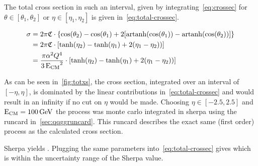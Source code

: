 The total cross section in such an interval, given by
integrating~\eqref{eq:crossec} for \(\theta\in [\theta_1, \theta_2]\)
or \(\eta\in [\eta_1, \eta_2]\) is given
in~\eqref{eq:total-crossec}.

\begin{equation}
  \label{eq:total-crossec}
  \begin{split}
  \sigma &=
  2\pi\mathfrak{C}\cdot\qty{\cos(\theta_2)-\cos(\theta_1)+2\qty[\operatorname{artanh}(\cos(\theta_1))
    - \operatorname{artanh}(\cos(\theta_2))]} \\
  &=2\pi\mathfrak{C}\cdot\qty[\tanh(\eta_2) - \tanh(\eta_1) + 2(\eta_1
  - \eta_2))] \\
  &={\frac{\pi\alpha^2Q^4}{3\operatorname{E_{\text{CM}}}^2}}\cdot\qty[\tanh(\eta_2) - \tanh(\eta_1) + 2(\eta_1
  - \eta_2))]
  \end{split}
\end{equation}

As can be seen in~\ref{fig:totxs}, the cross section, integrated over
an interval of \([-\eta, \eta]\), is dominated by the linear
contributions in~\ref{eq:total-crossec} and would result in an
infinity if no cut on \(\eta\) would be made.  Choosing
\(\eta\in [-2.5,2.5]\) and \(\operatorname{E_{\text{CM}}}=\SI{100}{\giga\electronvolt}\) the
process was monte carlo integrated in sherpa using the runcard
in~\ref{sec:qqggruncard}. This runcard describes the exact same (first
order) process as the calculated cross section.

Sherpa yields . Plugging the same parameters
into~\eqref{eq:total-crossec} gives  which is
within the uncertainty range of the Sherpa value.
